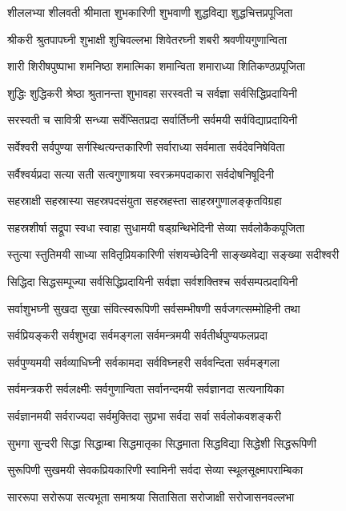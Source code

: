 \twolineshloka
{शीललभ्या शीलवती श्रीमाता शुभकारिणी}
{शुभवाणी शुद्धविद्या शुद्धचित्तप्रपूजिता}%

\twolineshloka
{श्रीकरी श्रुतपापघ्नी शुभाक्षी शुचिवल्लभा}
{शिवेतरघ्नी शबरी श्रवणीयगुणान्विता}%

\twolineshloka
{शारी शिरीषपुष्पाभा शमनिष्ठा शमात्मिका}
{शमान्विता शमाराध्या शितिकण्ठप्रपूजिता}%

\twolineshloka
{शुद्धिः शुद्धिकरी श्रेष्ठा श्रुतानन्ता शुभावहा}
{सरस्वती च सर्वज्ञा सर्वसिद्धिप्रदायिनी}%

\twolineshloka
{सरस्वती च सावित्री सन्ध्या सर्वेप्सितप्रदा}
{सर्वार्तिघ्नी सर्वमयी सर्वविद्याप्रदायिनी}%

\twolineshloka
{सर्वेश्वरी सर्वपुण्या सर्गस्थित्यन्तकारिणी}
{सर्वाराध्या सर्वमाता सर्वदेवनिषेविता}%

\twolineshloka
{सर्वैश्वर्यप्रदा सत्या सती सत्वगुणाश्रया}
{स्वरक्रमपदाकारा सर्वदोषनिषूदिनी}%

\twolineshloka
{सहस्राक्षी सहस्रास्या सहस्रपदसंयुता}
{सहस्रहस्ता साहस्रगुणालङ्कृतविग्रहा}%

\twolineshloka
{सहस्रशीर्षा सद्रूपा स्वधा स्वाहा सुधामयी}
{षड्ग्रन्थिभेदिनी सेव्या सर्वलोकैकपूजिता}%

\twolineshloka
{स्तुत्या स्तुतिमयी साध्या सवितृप्रियकारिणी}
{संशयच्छेदिनी साङ्ख्यवेद्या सङ्ख्या सदीश्वरी}%

\twolineshloka
{सिद्धिदा सिद्धसम्पूज्या सर्वसिद्धिप्रदायिनी}
{सर्वज्ञा सर्वशक्तिश्च सर्वसम्पत्प्रदायिनी}%

\twolineshloka
{सर्वाशुभघ्नी सुखदा सुखा संवित्स्वरूपिणी}
{सर्वसम्भीषणी सर्वजगत्सम्मोहिनी तथा}%

\twolineshloka
{सर्वप्रियङ्करी सर्वशुभदा सर्वमङ्गला}
{सर्वमन्त्रमयी सर्वतीर्थपुण्यफलप्रदा}%

\twolineshloka
{सर्वपुण्यमयी सर्वव्याधिघ्नी सर्वकामदा}
{सर्वविघ्नहरी सर्ववन्दिता सर्वमङ्गला}%

\twolineshloka
{सर्वमन्त्रकरी सर्वलक्ष्मीः सर्वगुणान्विता}
{सर्वानन्दमयी सर्वज्ञानदा सत्यनायिका}%

\twolineshloka
{सर्वज्ञानमयी सर्वराज्यदा सर्वमुक्तिदा}
{सुप्रभा सर्वदा सर्वा सर्वलोकवशङ्करी}%

\twolineshloka
{सुभगा सुन्दरी सिद्धा सिद्धाम्बा सिद्धमातृका}
{सिद्धमाता सिद्धविद्या सिद्धेशी सिद्धरूपिणी}%

\twolineshloka
{सुरूपिणी सुखमयी सेवकप्रियकारिणी}
{स्वामिनी सर्वदा सेव्या स्थूलसूक्ष्मापराम्बिका}%

\twolineshloka
{साररूपा सरोरूपा सत्यभूता समाश्रया}
{सितासिता सरोजाक्षी सरोजासनवल्लभा}%

